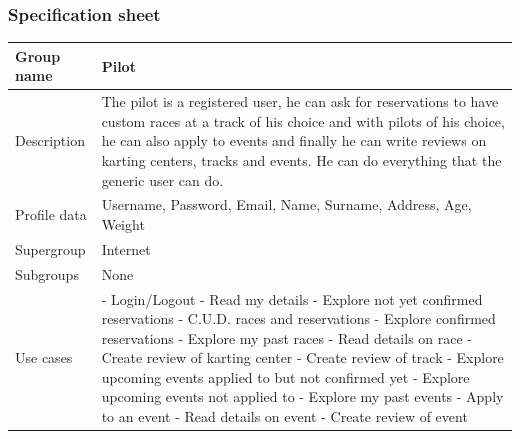 \documentclass{beamer}
\begin{document}
\begin{frame}
    \frametitle{Specification sheet}
    \begin{table}
        \tiny
        \begin{tabular}{|p{2cm}|p{6cm}|}
        \hline
        Group name & \textbf{Pilot} \\
        \hline
        Description & The pilot is a registered user, he can ask for reservations to have custom races
        at a track of his choice and with pilots of his choice, he can also apply to events and
        finally he can write reviews on karting centers, tracks and events.
        He can do everything that the generic user can do. \\
        \hline
        Profile data & Username, Password, Email, Name, Surname, Address, Age, Weight \\
        \hline
        Supergroup & Internet \\
        \hline
        Subgroups & None \\
        \hline
        Use cases &
        - Login/Logout \newline
        - Read my details \newline
        - Explore not yet confirmed reservations \newline
        - C.U.D. races and reservations
        - Explore confirmed reservations \newline
        - Explore my past races \newline
        - Read details on race \newline
        - Create review of karting center \newline
        - Create review of track \newline
        - Explore upcoming events applied to but not confirmed yet \newline
        - Explore upcoming events not applied to \newline
        - Explore my past events \newline
        - Apply to an event \newline
        - Read details on event \newline
        - Create review of event \\
        \hline
        \end{tabular}
    \end{table}
\end{frame}
\end{document}
